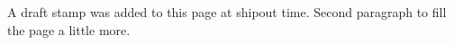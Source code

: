 \documentclass{article}
\begin{document}
A draft stamp was added to this page at shipout time.
Second paragraph to fill the page a little more.
\end{document}
